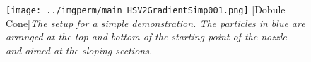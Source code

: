 \begin{figure}[H]
\centering
\texttt{[image: ../imgperm/main\_HSV2GradientSimp001.png]}
[Dobule Cone]{\textit{The setup for a simple demonstration. The particles in blue are arranged at the top and bottom of the starting point of the nozzle and aimed at the sloping sections.}}
\label{fig:main_HSV2GradientSimp001}
\end{figure}
